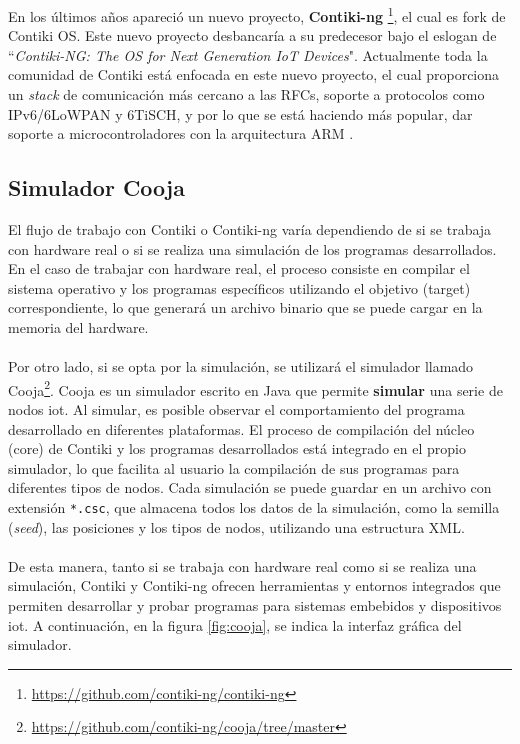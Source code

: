 En los últimos años apareció un nuevo proyecto, \textbf{Contiki-ng} \footnote{\url{https://github.com/contiki-ng/contiki-ng}}, el cual es fork de Contiki OS. Este nuevo proyecto desbancaría a su predecesor bajo el eslogan de ``\textit{Contiki-NG: The OS for Next Generation IoT Devices}". Actualmente toda la comunidad de Contiki está enfocada en este nuevo proyecto, el cual proporciona un \textit{stack} de comunicación más cercano a las RFCs, soporte a protocolos como IPv6/6LoWPAN y 6TiSCH, y por lo que se está haciendo más popular, dar soporte a microcontroladores con la arquitectura ARM \cite{kurniawan2018practical}.
\vspace{0.5cm}


\subsection{Simulador Cooja}

El flujo de trabajo con Contiki o Contiki-ng varía dependiendo de si se trabaja con hardware real o si se realiza una simulación de los programas desarrollados. En el caso de trabajar con hardware real, el proceso consiste en compilar el sistema operativo y los programas específicos utilizando el objetivo (target) correspondiente, lo que generará un archivo binario que se puede cargar en la memoria del hardware.\\
\\
Por otro lado, si se opta por la simulación, se utilizará el simulador llamado Cooja\footnote{\url{https://github.com/contiki-ng/cooja/tree/master}}. Cooja es un simulador escrito en Java que permite \textbf{simular} una serie de nodos \gls{iot}. Al simular, es posible observar el comportamiento del programa desarrollado en diferentes plataformas. El proceso de compilación del núcleo (core) de Contiki y los programas desarrollados está integrado en el propio simulador, lo que facilita al usuario la compilación de sus programas para diferentes tipos de nodos. Cada simulación se puede guardar en un archivo con extensión \texttt{*.csc}, que almacena todos los datos de la simulación, como la semilla (\textit{seed}), las posiciones y los tipos de nodos, utilizando una estructura XML.\\
\\
De esta manera, tanto si se trabaja con hardware real como si se realiza una simulación, Contiki y Contiki-ng ofrecen herramientas y entornos integrados que permiten desarrollar y probar programas para sistemas embebidos y dispositivos \gls{iot}. A continuación, en la figura \ref{fig:cooja}, se indica la interfaz gráfica del simulador.

